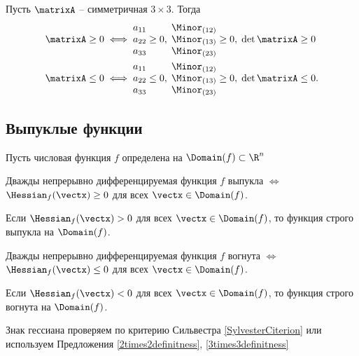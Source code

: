 \begin{propuesta}\label{3times3definitness}
Пусть $\matrixA$ -- симметричная $3\times 3$. Тогда
\begin{align*}
	\matrixA\geq 0 &\iff \begin{matrix} a_{11} \\ a_{22} \\ a_{33} \end{matrix}\geq0,\;
	\begin{matrix} \Minor_{(12)} \\ \Minor_{(13)} \\ \Minor_{(23)} \end{matrix}\geq0,\;
	\det\matrixA\geq0\\
	\matrixA\leq 0 &\iff \begin{matrix} a_{11} \\ a_{22} \\ a_{33} \end{matrix}\leq0,\;
	\begin{matrix} \Minor_{(12)} \\ \Minor_{(13)} \\ \Minor_{(23)} \end{matrix}\geq0,\;
	\det\matrixA\leq0.
\end{align*}
\end{propuesta}

\subsection{Выпуклые функции}

Пусть числовая функция \(f\) определена на %
\(\Domain(f)\subset \R^n\)

\begin{teorema}
Дважды непрерывно дифференцируемая функция $f$ выпукла $\iff$ 
$\Hessian_f(\vectx)\geq0$ %
для всех $\vectx\in\Domain(f)$.

Если $\Hessian_f(\vectx)>0$ для всех $\vectx\in\Domain(f)$, 
то функция строго выпукла на $\Domain(f)$.
\end{teorema}

\begin{col}
Дважды непрерывно дифференцируемая функция $f$ вогнута $\iff$ 
$\Hessian_f(\vectx)\leq0$ %
для всех $\vectx\in\Domain(f)$.

Если $\Hessian_f(\vectx)<0$ для всех $\vectx\in\Domain(f)$, 
то функция строго вогнута
на $\Domain(f)$.
\end{col}

\begin{remark}
Знак гессиана проверяем по критерию Сильвестра 
\ref{SylvesterCiterion} или
используем Предложения \ref{2times2definitness}, \ref{3times3definitness}
\end{remark}
	